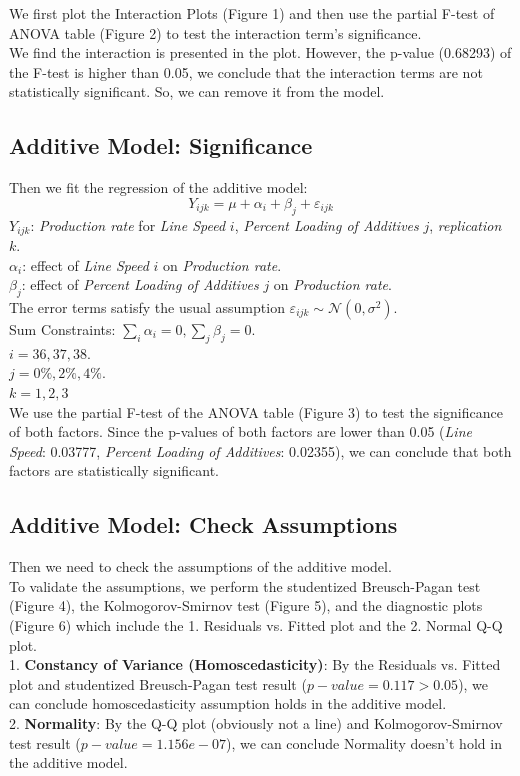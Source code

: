\documentclass[11pt,a4paper]{article}
\begin{document}
We first plot the Interaction Plots (Figure 1) and then use the partial F-test of ANOVA table (Figure 2) to test the interaction term's significance.\\
We find the interaction is presented in the plot. However, the p-value (0.68293) of the F-test is higher than 0.05, we conclude that the interaction terms are not statistically significant. So, we can remove it from the model.\\


\subsection{Additive Model: Significance}
Then we fit the regression of the additive model:
$$Y_{ijk}=\mu+\alpha_i+\beta_j+\varepsilon_{ijk}$$
$Y_{ijk}$: \textit{Production rate} for \textit{Line Speed} $i$, \textit{Percent Loading of Additives} $j$, \textit{replication} $k$.\\
$\alpha_i$: effect of \textit{Line Speed} $i$ on \textit{Production rate}.\\
$\beta_j$: effect of \textit{Percent Loading of Additives} $j$ on \textit{Production rate}.\\
The error terms satisfy the usual assumption $\varepsilon_{i j k} \sim \mathcal{N}\left(0, \sigma^{2}\right)$.\\
Sum Constraints: $\sum_{i} \alpha_{i}=0, \sum_{j} \beta_{j}=0$.\\
$i=36,37,38.$\\
$j=0\%,2\%,4\%.$\\
$k=1,2,3$\\

We use the partial F-test of the ANOVA table (Figure 3) to test the significance of both factors. Since the p-values of both factors are lower than 0.05 (\textit{Line Speed}: 0.03777, \textit{Percent Loading of Additives}: 0.02355), we can conclude that both factors are statistically significant.

\subsection{Additive Model: Check Assumptions}
Then we need to check the assumptions of the additive model.\\
To validate the assumptions, we perform the studentized Breusch-Pagan test (Figure 4), the Kolmogorov-Smirnov test (Figure 5), and the diagnostic plots (Figure 6) which include the 1. Residuals vs. Fitted plot and the 2. Normal Q-Q plot.\\
1. \textbf{Constancy of Variance (Homoscedasticity)}: By the Residuals vs. Fitted plot and studentized Breusch-Pagan test result ($p-value=0.117>0.05$), we can conclude homoscedasticity assumption holds in the additive model.\\
2. \textbf{Normality}: By the Q-Q plot (obviously not a line) and Kolmogorov-Smirnov test result ($p-value=1.156e-07$), we can conclude Normality doesn't hold in the additive model.
\end{document}
